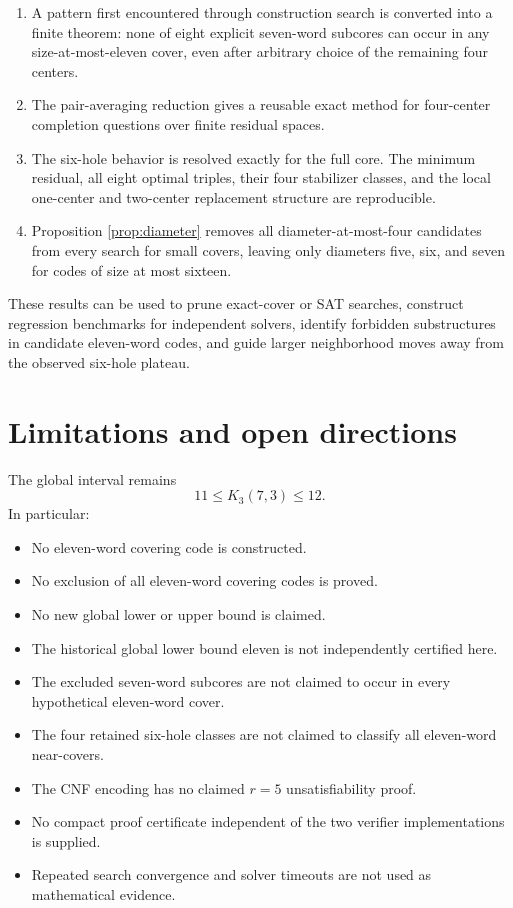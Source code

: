 \documentclass[11pt]{article}
\begin{document}
\begin{enumerate}[leftmargin=2em]
  \item A pattern first encountered through construction search is
        converted into a finite theorem: none of eight explicit seven-word
        subcores can occur in any size-at-most-eleven cover, even after
        arbitrary choice of the remaining four centers.
  \item The pair-averaging reduction gives a reusable exact method for
        four-center completion questions over finite residual spaces.
  \item The six-hole behavior is resolved exactly for the full core.  The
        minimum residual, all eight optimal triples, their four
        stabilizer classes, and the local one-center and two-center
        replacement structure are reproducible.
  \item Proposition \ref{prop:diameter} removes all diameter-at-most-four
        candidates from every search for small covers, leaving only
        diameters five, six, and seven for codes of size at most sixteen.
\end{enumerate}

These results can be used to prune exact-cover or SAT searches, construct
regression benchmarks for independent solvers, identify forbidden
substructures in candidate eleven-word codes, and guide larger
neighborhood moves away from the observed six-hole plateau.

\section{Limitations and open directions}

The global interval remains
\[
  11 \leq K_3(7,3) \leq 12.
\]
In particular:

\begin{itemize}[leftmargin=2em]
  \item No eleven-word covering code is constructed.
  \item No exclusion of all eleven-word covering codes is proved.
  \item No new global lower or upper bound is claimed.
  \item The historical global lower bound eleven is not independently
        certified here.
  \item The excluded seven-word subcores are not claimed to occur in every
        hypothetical eleven-word cover.
  \item The four retained six-hole classes are not claimed to classify
        all eleven-word near-covers.
  \item The CNF encoding has no claimed \(r=5\) unsatisfiability proof.
  \item No compact proof certificate independent of the two verifier
        implementations is supplied.
  \item Repeated search convergence and solver timeouts are not used as
        mathematical evidence.
\end{itemize}
\end{document}
